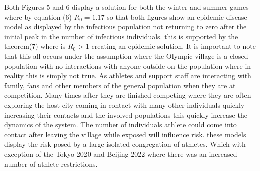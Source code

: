 \documentclass[12pt, oneside]{article}
\begin{document}
Both Figures 5 and 6 display a solution for both the winter and summer games where by equation (6) $R_0=1.17$ so that both figures show an epidemic disease model as displayed by the infectious population not returning to zero after the initial peak in the number of infectious individuals. this is supported by the theorem(7) where is $R_0>1$ creating an epidemic solution. It is important to note that this all occurs under the assumption where the Olympic village is a closed population with no interactions with anyone outside on the population where in reality this is simply not true. As athletes and support staff are interacting with family, fans and other members of the general population when they are at competition. Many times after they are finished competing where they are often exploring the host city coming in contact with many other individuals quickly increasing their  contacts and the involved populations this quickly increase the dynamics of the system. The number of individuals athlete could come into contact after leaving the village while exposed will influence risk. these models display the risk posed by a large isolated congregation of athletes. Which with exception of the Tokyo 2020 and Beijing 2022 where there was an increased number of athlete restrictions.
\end{document}
